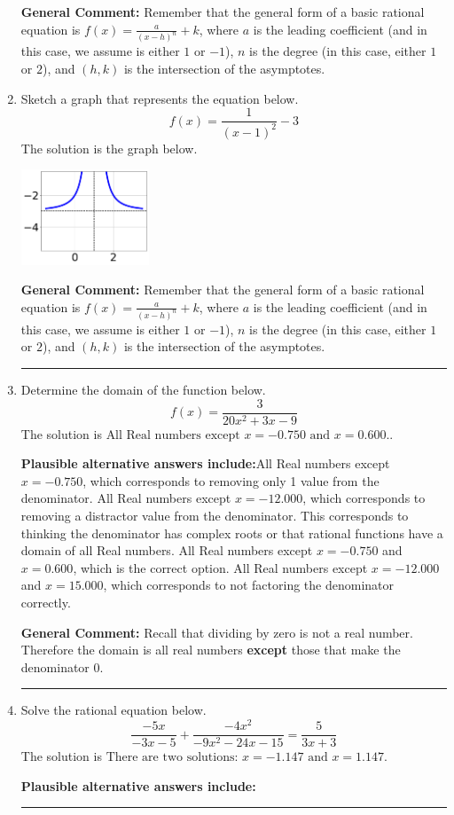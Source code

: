\documentclass{extbook}[14pt]
\newcommand{\litem}[1]{\item #1

\rule{\textwidth}{0.4pt}}
\begin{document}
\begin{enumerate}
{\textbf{General Comment:} Remember that the general form of a basic rational equation is $ f(x) = \frac{a}{(x-h)^n} + k$, where $a$ is the leading coefficient (and in this case, we assume is either $1$ or $-1$), $n$ is the degree (in this case, either $1$ or $2$), and $(h, k)$ is the intersection of the asymptotes.
}
\litem{
Sketch a graph that represents the equation below.
\[ f(x) = \frac{1}{(x - 1)^2} - 3 \]The solution is the graph below.
    \begin{center}
        \includegraphics[width=0.3\textwidth]{../Figures/rationalEquationToGraphCC.png}
    \end{center}

\textbf{General Comment:} Remember that the general form of a basic rational equation is $ f(x) = \frac{a}{(x-h)^n} + k$, where $a$ is the leading coefficient (and in this case, we assume is either $1$ or $-1$), $n$ is the degree (in this case, either $1$ or $2$), and $(h, k)$ is the intersection of the asymptotes.
}
\litem{
Determine the domain of the function below.
\[ f(x) = \frac{3}{20x^{2} +3 x -9} \]The solution is \( \text{All Real numbers except } x = -0.750 \text{ and } x = 0.600. \).\begin{enumerate}[label=\Alph*.]
\textbf{Plausible alternative answers include:}All Real numbers except $x = -0.750$, which corresponds to removing only 1 value from the denominator.
All Real numbers except $x = -12.000$, which corresponds to removing a distractor value from the denominator.
This corresponds to thinking the denominator has complex roots or that rational functions have a domain of all Real numbers.
All Real numbers except $x = -0.750$ and $x = 0.600$, which is the correct option.
All Real numbers except $x = -12.000$ and $x = 15.000$, which corresponds to not factoring the denominator correctly.
\end{enumerate}

\textbf{General Comment:} Recall that dividing by zero is not a real number. Therefore the domain is all real numbers \textbf{except} those that make the denominator 0.
}
\litem{
Solve the rational equation below.
\[ \frac{-5x}{-3x -5} + \frac{-4x^{2}}{-9x^{2} -24 x -15} = \frac{5}{3x + 3} \]The solution is \( \text{There are two solutions: } x = -1.147 \text{ and } x = 1.147 \).\begin{enumerate}[label=\Alph*.]
\textbf{Plausible alternative answers include:}


\end{enumerate}}
\end{enumerate}
\end{document}
